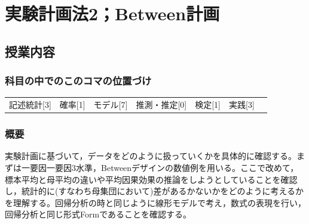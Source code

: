 \section{実験計画法2；Between計画}
\label{s13_design2}

\subsection{授業内容}
\subsubsection{科目の中でのこのコマの位置づけ}
\begin{tabular}[t]{ccccccc}
	記述統計[3] & 確率[1] & モデル[7] & 推測・推定[0] & 検定[1] & 実践[3]
\end{tabular}
\subsubsection{概要}
実験計画に基づいて，データをどのように扱っていくかを具体的に確認する。まずは一要因一要因3水準，Betweenデザインの数値例を用いる。ここで改めて，標本平均と母平均の違いや平均因果効果の推論をしようとしていることを確認し，統計的に(すなわち母集団において)差があるかないかをどのように考えるかを理解する。回帰分析の時と同じように線形モデルで考え，数式の表現を行い，回帰分析と同じ形式Formであることを確認する。
